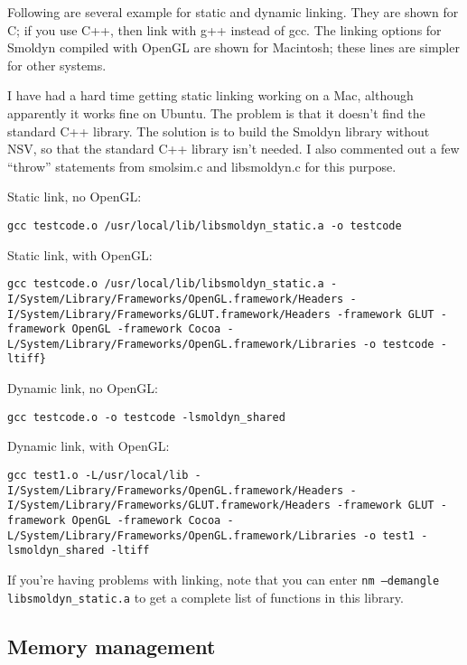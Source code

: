 \documentclass {scrbook}
\newcommand {\ttt} {\texttt}
\begin{document}
Following are several example for static and dynamic linking. They are shown for C; if you use C++, then link with g++ instead of gcc. The linking options for Smoldyn compiled with OpenGL are shown for Macintosh; these lines are simpler for other systems.

I have had a hard time getting static linking working on a Mac, although apparently it works fine on Ubuntu. The problem is that it doesn't find the standard C++ library. The solution is to build the Smoldyn library without NSV, so that the standard C++ library isn't needed. I also commented out a few ``throw'' statements from smolsim.c and libsmoldyn.c for this purpose.

Static link, no OpenGL:
\begin{lstlisting}[style=SSAC]
gcc testcode.o /usr/local/lib/libsmoldyn_static.a -o testcode
\end{lstlisting}

Static link, with OpenGL:
\begin{lstlisting}[style=SSAC]
gcc testcode.o /usr/local/lib/libsmoldyn_static.a -I/System/Library/Frameworks/OpenGL.framework/Headers -I/System/Library/Frameworks/GLUT.framework/Headers -framework GLUT -framework OpenGL -framework Cocoa -L/System/Library/Frameworks/OpenGL.framework/Libraries -o testcode -ltiff}
\end{lstlisting}

Dynamic link, no OpenGL:
\begin{lstlisting}[style=SSAC]
gcc testcode.o -o testcode -lsmoldyn_shared
\end{lstlisting}

Dynamic link, with OpenGL:
\begin{lstlisting}[style=SSAC]
gcc test1.o -L/usr/local/lib -I/System/Library/Frameworks/OpenGL.framework/Headers -I/System/Library/Frameworks/GLUT.framework/Headers -framework GLUT -framework OpenGL -framework Cocoa -L/System/Library/Frameworks/OpenGL.framework/Libraries -o test1 -lsmoldyn_shared -ltiff
\end{lstlisting}

If you're having problems with linking, note that you can enter \ttt{nm --demangle libsmoldyn\_static.a} to get a complete list of functions in this library.

\subsection*{Memory management}
\end{document}

